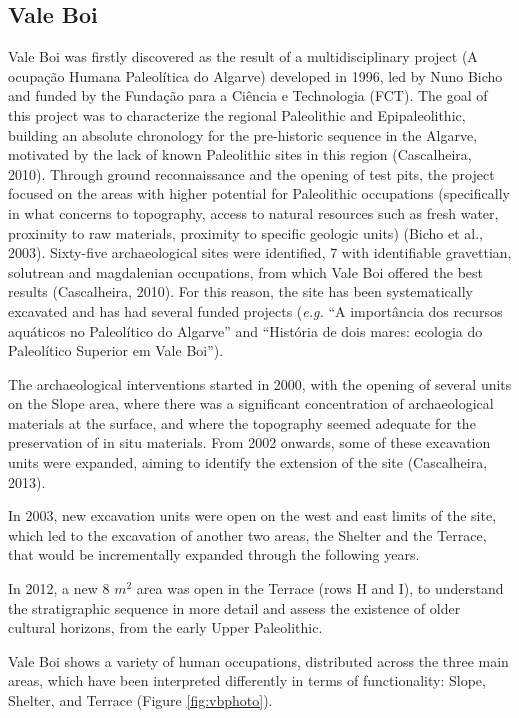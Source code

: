 \documentclass[12pt,twoside]{reedthesis}
\begin{document}
\hypertarget{vale-boi-1}{%
\subsection{Vale Boi}\label{vale-boi-1}}

Vale Boi was firstly discovered as the result of a multidisciplinary project (A ocupação Humana Paleolítica do Algarve) developed in 1996, led by Nuno Bicho and funded by the Fundação para a Ciência e Technologia (FCT). The goal of this project was to characterize the regional Paleolithic and Epipaleolithic, building an absolute chronology for the pre-historic sequence in the Algarve, motivated by the lack of known Paleolithic sites in this region (Cascalheira, 2010). Through ground reconnaissance and the opening of test pits, the project focused on the areas with higher potential for Paleolithic occupations (specifically in what concerns to topography, access to natural resources such as fresh water, proximity to raw materials, proximity to specific geologic units) (Bicho et al., 2003). Sixty-five archaeological sites were identified, 7 with identifiable gravettian, solutrean and magdalenian occupations, from which Vale Boi offered the best results (Cascalheira, 2010). For this reason, the site has been systematically excavated and has had several funded projects (\emph{e.g.} ``A importância dos recursos aquáticos no Paleolítico do Algarve'' and ``História de dois mares: ecologia do Paleolítico Superior em Vale Boi'').

The archaeological interventions started in 2000, with the opening of several units on the Slope area, where there was a significant concentration of archaeological materials at the surface, and where the topography seemed adequate for the preservation of in situ materials. From 2002 onwards, some of these excavation units were expanded, aiming to identify the extension of the site (Cascalheira, 2013).

In 2003, new excavation units were open on the west and east limits of the site, which led to the excavation of another two areas, the Shelter and the Terrace, that would be incrementally expanded through the following years.

In 2012, a new 8 \(m^2\) area was open in the Terrace (rows H and I), to understand the stratigraphic sequence in more detail and assess the existence of older cultural horizons, from the early Upper Paleolithic.

Vale Boi shows a variety of human occupations, distributed across the three main areas, which have been interpreted differently in terms of functionality: Slope, Shelter, and Terrace (Figure \ref{fig:vbphoto}).
\end{document}
